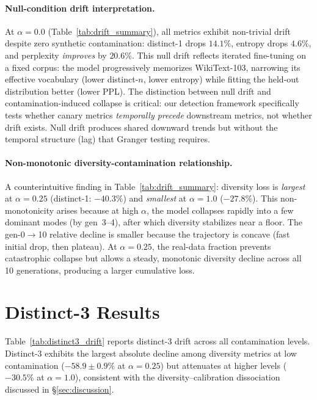 \paragraph{Null-condition drift interpretation.}
At $\alpha{=}0.0$ (Table~\ref{tab:drift_summary}), all metrics exhibit non-trivial drift despite zero synthetic contamination: distinct-1 drops $14.1\%$, entropy drops $4.6\%$, and perplexity \emph{improves} by $20.6\%$.
This null drift reflects iterated fine-tuning on a fixed corpus: the model progressively memorizes WikiText-103, narrowing its effective vocabulary (lower distinct-$n$, lower entropy) while fitting the held-out distribution better (lower PPL).
The distinction between null drift and contamination-induced collapse is critical: our detection framework specifically tests whether canary metrics \emph{temporally precede} downstream metrics, not whether drift exists.
Null drift produces shared downward trends but without the temporal structure (lag) that Granger testing requires.

\paragraph{Non-monotonic diversity-contamination relationship.}
A counterintuitive finding in Table~\ref{tab:drift_summary}: diversity loss is \emph{largest} at $\alpha{=}0.25$ (distinct-1: $-40.3\%$) and \emph{smallest} at $\alpha{=}1.0$ ($-27.8\%$).
This non-monotonicity arises because at high $\alpha$, the model collapses rapidly into a few dominant modes (by gen~3--4), after which diversity stabilizes near a floor.
The gen-0$\to$10 relative decline is smaller because the trajectory is concave (fast initial drop, then plateau).
At $\alpha{=}0.25$, the real-data fraction prevents catastrophic collapse but allows a steady, monotonic diversity decline across all 10 generations, producing a larger cumulative loss.


\section{Distinct-3 Results}
\label{app:distinct3}

Table~\ref{tab:distinct3_drift} reports distinct-3 drift across all contamination levels.
Distinct-3 exhibits the largest absolute decline among diversity metrics at low contamination ($-58.9{\pm}0.9\%$ at $\alpha{=}0.25$) but attenuates at higher levels ($-30.5\%$ at $\alpha{=}1.0$), consistent with the diversity--calibration dissociation discussed in \S\ref{sec:discussion}.

